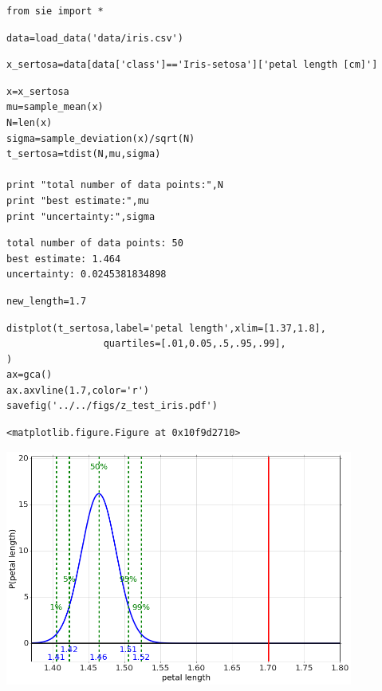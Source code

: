 \begin{lstlisting}
from sie import *
\end{lstlisting}

\begin{lstlisting}
data=load_data('data/iris.csv')
\end{lstlisting}

\begin{lstlisting}
x_sertosa=data[data['class']=='Iris-setosa']['petal length [cm]']
\end{lstlisting}

\begin{lstlisting}
x=x_sertosa
mu=sample_mean(x)
N=len(x)
sigma=sample_deviation(x)/sqrt(N)
t_sertosa=tdist(N,mu,sigma)

print "total number of data points:",N
print "best estimate:",mu
print "uncertainty:",sigma
\end{lstlisting}

\begin{verbatim}
total number of data points: 50
best estimate: 1.464
uncertainty: 0.0245381834898
\end{verbatim}

\begin{lstlisting}
new_length=1.7
\end{lstlisting}

\begin{lstlisting}
distplot(t_sertosa,label='petal length',xlim=[1.37,1.8],
                 quartiles=[.01,0.05,.5,.95,.99],
)
ax=gca()
ax.axvline(1.7,color='r')
savefig('../../figs/z_test_iris.pdf')
\end{lstlisting}

\begin{verbatim}
<matplotlib.figure.Figure at 0x10f9d2710>\end{verbatim}

\begin{center}\includegraphics[width=4.5in]{Common_Significance_Tests/Common_Significance_Tests_fig0.png}\end{center}

\begin{lstlisting}

\end{lstlisting}

